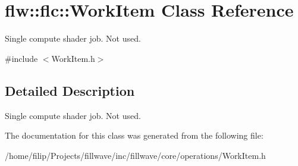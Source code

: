 \hypertarget{classflw_1_1flc_1_1WorkItem}{}\section{flw\+:\+:flc\+:\+:Work\+Item Class Reference}
\label{classflw_1_1flc_1_1WorkItem}


Single compute shader job. Not used.  




{\ttfamily \#include $<$Work\+Item.\+h$>$}



\subsection{Detailed Description}
Single compute shader job. Not used. 

The documentation for this class was generated from the following file\+:\begin{DoxyCompactItemize}
\item 
/home/filip/\+Projects/fillwave/inc/fillwave/core/operations/Work\+Item.\+h\end{DoxyCompactItemize}

